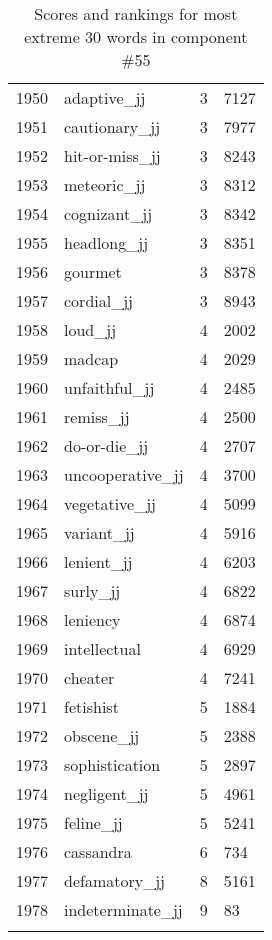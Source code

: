 \begin{longtable}[!htbp]{| rlr@{.}l |}
    1950 & adaptive\_jj & 3 & 7127 \\
    1951 & cautionary\_jj & 3 & 7977 \\
    1952 & hit-or-miss\_jj & 3 & 8243 \\
    1953 & meteoric\_jj & 3 & 8312 \\
    1954 & cognizant\_jj & 3 & 8342 \\
    1955 & headlong\_jj & 3 & 8351 \\
    1956 & gourmet & 3 & 8378 \\
    1957 & cordial\_jj & 3 & 8943 \\
    1958 & loud\_jj & 4 & 2002 \\
    1959 & madcap & 4 & 2029 \\
    1960 & unfaithful\_jj & 4 & 2485 \\
    1961 & remiss\_jj & 4 & 2500 \\
    1962 & do-or-die\_jj & 4 & 2707 \\
    1963 & uncooperative\_jj & 4 & 3700 \\
    1964 & vegetative\_jj & 4 & 5099 \\
    1965 & variant\_jj & 4 & 5916 \\
    1966 & lenient\_jj & 4 & 6203 \\
    1967 & surly\_jj & 4 & 6822 \\
    1968 & leniency & 4 & 6874 \\
    1969 & intellectual & 4 & 6929 \\
    1970 & cheater & 4 & 7241 \\
    1971 & fetishist & 5 & 1884 \\
    1972 & obscene\_jj & 5 & 2388 \\
    1973 & sophistication & 5 & 2897 \\
    1974 & negligent\_jj & 5 & 4961 \\
    1975 & feline\_jj & 5 & 5241 \\
    1976 & cassandra & 6 & 734 \\
    1977 & defamatory\_jj & 8 & 5161 \\
    1978 & indeterminate\_jj & 9 & 83 \\
    \hline
    \caption{Scores and rankings for most extreme 30 words in component \#55} \\
\end{longtable}
